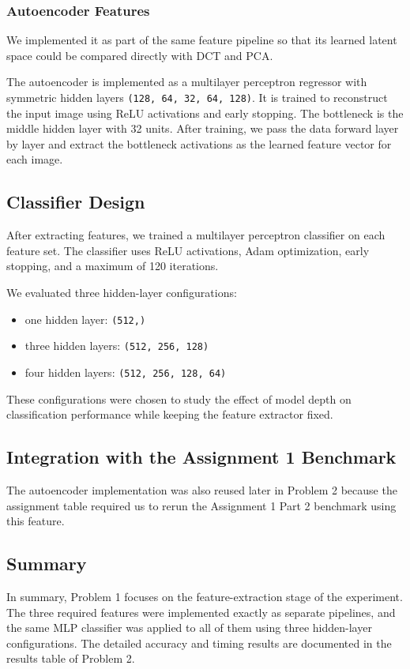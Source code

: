\subsubsection{Autoencoder Features}
We implemented it as part of the same feature pipeline so that its learned latent space could be compared directly with DCT and PCA.

The autoencoder is implemented as a multilayer perceptron regressor with symmetric hidden layers \texttt{(128, 64, 32, 64, 128)}. It is trained to reconstruct the input image using ReLU activations and early stopping. The bottleneck is the middle hidden layer with 32 units. After training, we pass the data forward layer by layer and extract the bottleneck activations as the learned feature vector for each image.

\subsection{Classifier Design}
After extracting features, we trained a multilayer perceptron classifier on each feature set. The classifier uses ReLU activations, Adam optimization, early stopping, and a maximum of 120 iterations.

We evaluated three hidden-layer configurations:
\begin{itemize}
  \item one hidden layer: \texttt{(512,)}
  \item three hidden layers: \texttt{(512, 256, 128)}
  \item four hidden layers: \texttt{(512, 256, 128, 64)}
\end{itemize}

These configurations were chosen to study the effect of model depth on classification performance while keeping the feature extractor fixed.

\subsection{Integration with the Assignment 1 Benchmark}
The autoencoder implementation was also reused later in Problem 2 because the assignment table required us to rerun the Assignment 1 Part 2 benchmark using this feature.

\subsection{Summary}
In summary, Problem 1 focuses on the feature-extraction stage of the experiment. The three required features were implemented exactly as separate pipelines, and the same MLP classifier was applied to all of them using three hidden-layer configurations. The detailed accuracy and timing results are documented in the results table of Problem 2.

\endgroup